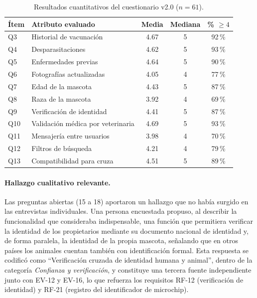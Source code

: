 \documentclass[journal,onecolumn]{IEEEtran}
\begin{document}
	\begin{table}[H]
		\centering
		\caption{Resultados cuantitativos del cuestionario v2.0 ($n = 61$).}
		\label{tab:cuestionario-resultados}
		\small
		\begin{tabularx}{\textwidth}{@{}l X c c c@{}}
			\toprule
			\textbf{Ítem} & \textbf{Atributo evaluado} & \textbf{Media} & \textbf{Mediana} & \textbf{\% $\geq 4$} \\
			\midrule
			
			Q3 & Historial de vacunación & 4.67 & 5 & 92\,\% \\
			
			Q4 & Desparasitaciones & 4.62 & 5 & 93\,\% \\
			
			Q5 & Enfermedades previas & 4.64 & 5 & 90\,\% \\
			
			Q6 & Fotografías actualizadas & 4.05 & 4 & 77\,\% \\
			
			Q7 & Edad de la mascota & 4.43 & 5 & 87\,\% \\
			
			Q8 & Raza de la mascota & 3.92 & 4 & 69\,\% \\
			
			Q9 & Verificación de identidad & 4.41 & 5 & 87\,\% \\
			
			Q10 & Validación médica por veterinaria & 4.69 & 5 & 93\,\% \\
			
			Q11 & Mensajería entre usuarios & 3.98 & 4 & 70\,\% \\
			
			Q12 & Filtros de búsqueda & 4.21 & 4 & 79\,\% \\
			
			Q13 & Compatibilidad para cruza & 4.51 & 5 & 89\,\% \\
			
			\bottomrule
		\end{tabularx}
	\end{table}
	
	\paragraph{Hallazgo cualitativo relevante.}
	Las preguntas abiertas (15 a 18) aportaron un hallazgo que no había surgido
	en las entrevistas individuales. Una persona encuestada propuso, al describir
	la funcionalidad que consideraba indispensable, una función que permitiera
	verificar la identidad de los propietarios mediante su documento nacional de
	identidad y, de forma paralela, la identidad de la propia mascota, señalando
	que en otros países los animales cuentan también con identificación formal.
	Esta respuesta se codificó como \enquote{Verificación cruzada de identidad
		humana y animal}, dentro de la categoría \emph{Confianza y verificación}, y
	constituye una tercera fuente independiente junto con EV-12 y EV-16, lo que
	refuerza los requisitos RF-12 (verificación de identidad) y RF-21 (registro
	del identificador de microchip).
	
\end{document}

